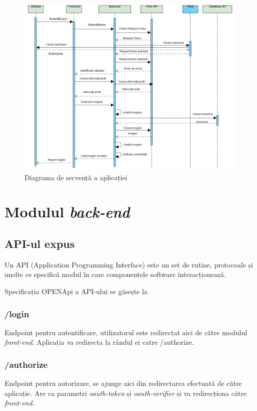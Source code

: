 \begin{figure}[!htbp]
    \begin{center}
        \includegraphics[width=1.0\textwidth]{images/secventa.png}
        \caption{Diagrama de secvență a aplicației}
    \end{center}
\end{figure}

\pagebreak
\section{Modulul \textit{back-end}}

\subsection{API-ul expus}
Un API (Application Programming Interface) este un set de rutine, protocoale  și unelte ce specifică modul în care componentele software interacționează.\cite{what-is-api}

Specificația OPENApi\cite{open-api} a API-ului se găsește la ~
\subsubsection{/login}
Endpoint pentru autentificare, utilizatorul este redirectat aici de către modulul \textit{front-end}. Aplicația va redirecta la rândul ei catre /authorize.

\subsubsection{/authorize}
Endpoint pentru autorizare, se ajunge aici din redirectarea efectuată de către aplicație. Are ca parametri \textit{oauth-token} și \textit{oauth-verifier} și va redirecționa către \textit{front-end}.


